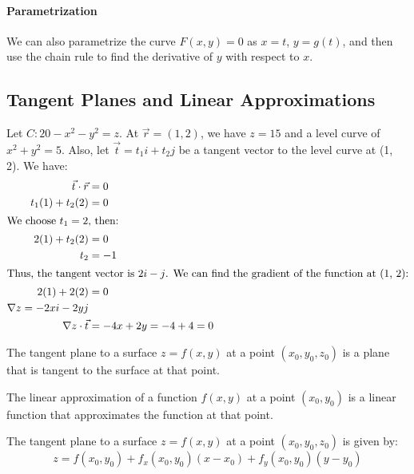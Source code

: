 \documentclass[11pt]{report}
\begin{document}
\paragraph{Parametrization} We can also parametrize the curve $F(x, y) = 0$ as $x=t$, $y=g(t)$, and then use the chain rule to find the derivative of $y$ with respect to $x$.
\subsection{Tangent Planes and Linear Approximations}
\begin{example}
    Let $C: 20 - x^2 - y^2 = z$. At $\vec{r} = (1,2)$, we have $z = 15$ and a level curve of $x^2 + y^2 = 5$. Also, let $\vec{t} = t_1i + t_2j$ be a tangent vector to the level curve at (1, 2). We have:
    \begin{align*}
        \vec{t}\cdot \vec{r} &= 0 \\
        t_1(1) + t_2(2) &= 0 \\
        \intertext{We choose $t_1 = 2$, then:}
        2(1) + t_2(2) &= 0 \\
        t_2 &= -1 \\
        \intertext{Thus, the tangent vector is $2i - j$. We can find the gradient of the function at (1, 2):}
        2(1) + 2(2) &= 0 \\
        \nabla z = -2xi - 2yj \\
        \nabla z \cdot \vec{t} &= -4x + 2y = -4 + 4 = 0
    \end{align*}
\end{example}
\begin{definition}
    The tangent plane to a surface $z = f(x, y)$ at a point $(x_0, y_0, z_0)$ is a plane that is tangent to the surface at that point.
\end{definition}
\begin{definition}
    The linear approximation of a function $f(x, y)$ at a point $(x_0, y_0)$ is a linear function that approximates the function at that point.
\end{definition}
\begin{theorem}
    The tangent plane to a surface $z = f(x, y)$ at a point $(x_0, y_0, z_0)$ is given by:
    \begin{equation}
        z = f(x_0, y_0) + f_x(x_0, y_0)(x - x_0) + f_y(x_0, y_0)(y - y_0)
    \end{equation}
\end{theorem}
\end{document}

